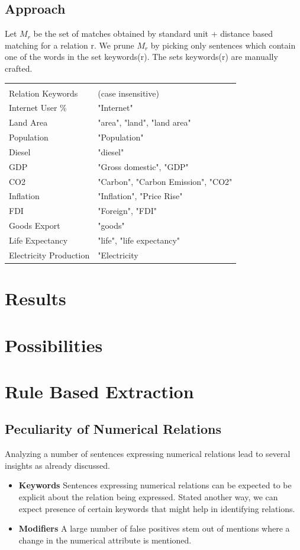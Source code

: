 \documentclass[a4paper,10pt]{article}
\begin{document}
\subsection{Approach}
Let $M_r$ be the set of matches obtained by standard unit + distance based matching for a relation r.
We prune $M_r$ by picking only sentences which contain one of the words in the set keywords(r).
The sets keywords(r) are manually crafted.

\begin{center}
 \begin{tabular}{|l|l|}
\hline \\
 Relation Keywords & (case insensitive)\\
\hline
 Internet User \% &"Internet"\\
Land Area &"area", "land", "land area"\\
Population &"Population"\\
Diesel &"diesel"\\
GDP &"Gross domestic", "GDP"\\
CO2 &"Carbon", "Carbon Emission", "CO2"\\
Inflation &"Inflation", "Price Rise"\\
FDI &"Foreign", "FDI"\\
Goods Export & "goods"\\
Life Expectancy & "life", "life expectancy"\\
Electricity Production & "Electricity\\
\hline
\end{tabular}
 \end{center}



\section{Results}

\section{Possibilities}

\section{Rule Based Extraction}

\subsection{Peculiarity of Numerical Relations}
Analyzing a number of sentences expressing numerical relations lead to several insights as already discussed.
\begin{itemize}
 \item \textbf{Keywords} Sentences expressing numerical relations can be expected to be explicit about the relation being expressed.
 Stated another way, we can expect presence of certain keywords that might help in identifying relations.
 \item \textbf{Modifiers} A large number of false positives stem out of mentions where a change in the numerical attribute is mentioned.
\end{itemize}
\end{document}
